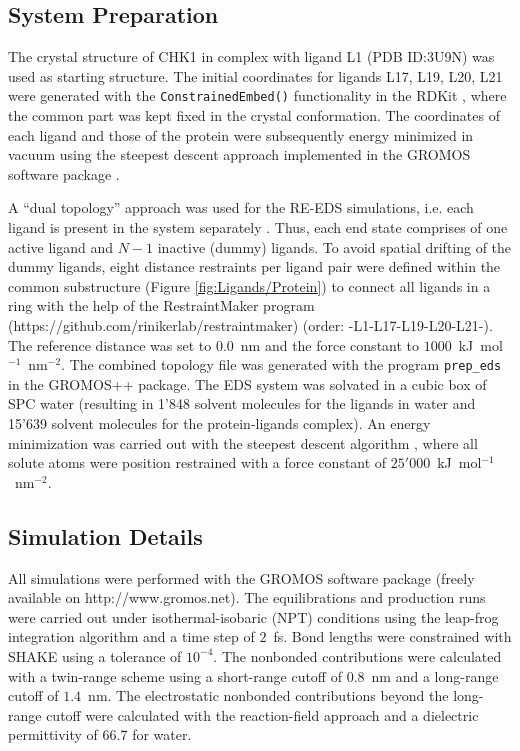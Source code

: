 \subsection{System Preparation}%
The crystal structure of CHK1 in complex with ligand L1 (PDB ID:3U9N) was used as starting structure. The initial coordinates for ligands L17, L19, L20, L21 were generated with the {\tt{ConstrainedEmbed()}} functionality in the RDKit \cite{Landrum2021}, where the common part was kept fixed in the crystal conformation. The coordinates of each ligand and those of the protein were subsequently energy minimized in vacuum using the steepest descent \cite{Ruder2016} approach implemented in the GROMOS software package \cite{Schmid2012}. 

A ``dual topology'' approach was used for the RE-EDS simulations, i.e. each ligand is present in the system separately \cite{Riniker2011}. Thus, each end state comprises of one active ligand and $N-1$ inactive (dummy) ligands. To avoid spatial drifting of the dummy ligands, eight distance restraints per ligand pair were defined within the common substructure (Figure \ref{fig:Ligands/Protein}) to connect all ligands in a ring with the help of the RestraintMaker program (https://github.com/rinikerlab/restraintmaker) (order: -L1-L17-L19-L20-L21-). The reference distance was set to 0.0~nm and the force constant to $1000$~kJ~mol$^{-1}$~nm$^{-2}$.
The combined topology file was generated with the program {\tt{prep\_eds}} in the GROMOS++ \cite{Eichenberger2011} package. 
The EDS system was solvated in a cubic box of SPC \cite{Berendsen1981} water (resulting in 1'848 solvent molecules for the ligands in water and 15'639 solvent molecules for the protein-ligands complex). 
An energy minimization was carried out with the steepest descent algorithm \cite{Ruder2016}, where all solute atoms were position restrained with a force constant of $25'000$~kJ~mol$^{-1}$~nm$^{-2}$. 

\subsection{Simulation Details}
All simulations were performed with the GROMOS software package \cite{Schmid2012} (freely available on http://www.gromos.net).
The equilibrations and production runs were carried out under isothermal-isobaric (NPT) conditions using the leap-frog integration algorithm \cite{Hockney1970} and a time step of $2$~fs. 
Bond lengths were constrained with SHAKE \cite{Ryckaert1977} using a tolerance of $10^{-4}$. 
The nonbonded contributions were calculated with a twin-range scheme using a short-range cutoff of $0.8$~nm and a long-range cutoff of $1.4$~nm. 
The electrostatic nonbonded contributions beyond the long-range cutoff were calculated with the reaction-field \cite{Tironi1995} approach and a dielectric permittivity of 66.7 \cite{Glattli2002} for water. 


